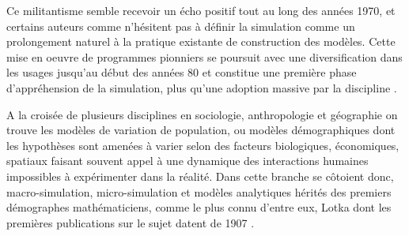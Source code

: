 Ce militantisme semble recevoir un écho positif tout au long des années 1970, et certains auteurs comme \textcite[38]{Whallon1972} n'hésitent pas à définir la simulation comme un prolongement naturel à la pratique existante de construction des modèles. Cette mise en oeuvre de programmes pionniers se poursuit avec une diversification dans les usages jusqu'au début des années 80 et constitue une première phase d'appréhension de la simulation, plus qu'une adoption massive par la discipline \autocite{Lake2013}.



A la croisée de plusieurs disciplines en sociologie, anthropologie et géographie on trouve les modèles de variation de population, ou modèles démographiques dont les hypothèses sont amenées à varier selon des facteurs biologiques, économiques, spatiaux faisant souvent appel à une dynamique des interactions humaines impossibles à expérimenter dans la réalité. Dans cette branche se côtoient donc, macro-simulation, micro-simulation et modèles analytiques hérités des premiers démographes mathématiciens, comme le plus connu d'entre eux, Lotka dont les premières publications sur le sujet datent de 1907 \autocite[355]{Veron2009}.


